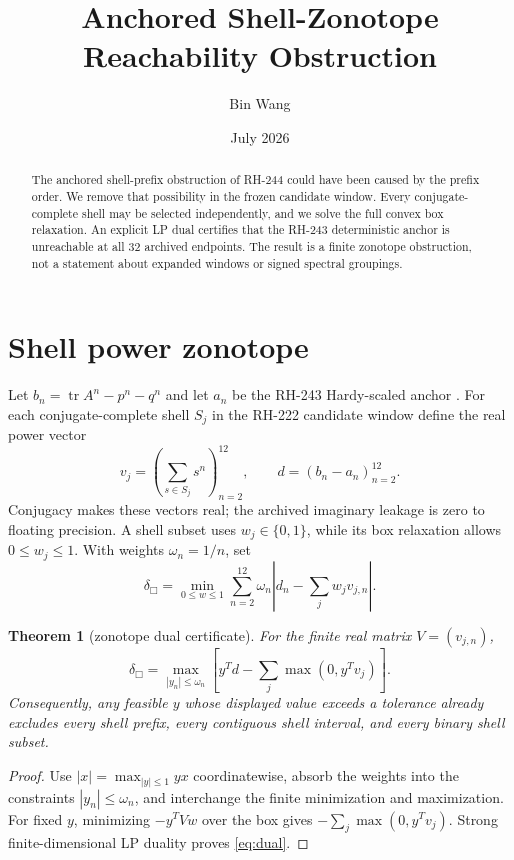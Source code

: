 \documentclass[11pt]{article}
\title{Anchored Shell-Zonotope Reachability Obstruction}
\author{Bin Wang}
\date{July 2026}
\newtheorem{theorem}{Theorem}
\begin{document}
\maketitle

\begin{abstract}
The anchored shell-prefix obstruction of RH-244 could have been caused by the
prefix order.  We remove that possibility in the frozen candidate window.
Every conjugate-complete shell may be selected independently, and we solve
the full convex box relaxation.  An explicit LP dual certifies that the
RH-243 deterministic anchor is unreachable at all 32 archived endpoints.
The result is a finite zonotope obstruction, not a statement about expanded
windows or signed spectral groupings.
\end{abstract}

\section{Shell power zonotope}

Let $b_n=\operatorname{tr}A^n-p^n-q^n$ and let $a_n$ be the RH-243
Hardy-scaled anchor \citep{WangRH243}.  For each conjugate-complete shell
$S_j$ in the RH-222 candidate window define the real power vector
\[
 v_j=(\sum_{s\in S_j}s^n)_{n=2}^{12},
 \qquad d=(b_n-a_n)_{n=2}^{12}.
\]
Conjugacy makes these vectors real; the archived imaginary leakage is zero to
floating precision.  A shell subset uses $w_j\in\{0,1\}$, while its box
relaxation allows $0\le w_j\le1$.  With weights $\omega_n=1/n$, set
\begin{equation}\label{eq:box}
 \delta_\Box=\min_{0\le w\le1}
 \sum_{n=2}^{12}\omega_n\left|d_n-\sum_jw_jv_{j,n}\right|.
\end{equation}

\begin{theorem}[zonotope dual certificate]\label{thm:dual}
For the finite real matrix $V=(v_{j,n})$,
\begin{equation}\label{eq:dual}
 \delta_\Box=
 \max_{|y_n|\le\omega_n}
 \left[y^Td-\sum_j\max(0,y^Tv_j)\right].
\end{equation}
Consequently, any feasible $y$ whose displayed value exceeds a tolerance
already excludes every shell prefix, every contiguous shell interval, and
every binary shell subset.
\end{theorem}

\begin{proof}
Use $|x|=\max_{|y|\le1}yx$ coordinatewise, absorb the weights into the
constraints $|y_n|\le\omega_n$, and interchange the finite minimization and
maximization.  For fixed $y$, minimizing
$-y^TVw$ over the box gives
$-\sum_j\max(0,y^Tv_j)$.  Strong finite-dimensional LP duality proves
\eqref{eq:dual}.
\end{proof}
\end{document}
